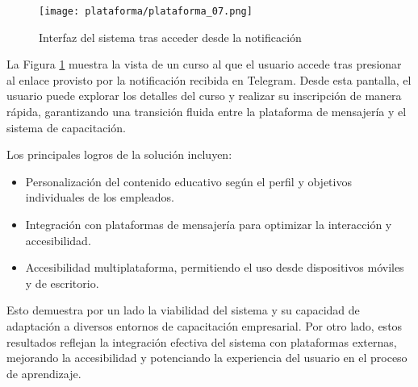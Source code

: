 \begin{figure}[H]
    \centering
    \texttt{[image: plataforma/plataforma\_07.png]}
    \caption{Interfaz del sistema tras acceder desde la notificación}
    \label{fig:interfaz_curso_ejemplo}
\end{figure}

La Figura \ref{fig:interfaz_curso_ejemplo} muestra la vista de un curso al que
el usuario accede tras presionar al enlace provisto por la notificación
recibida en Telegram. Desde esta pantalla, el usuario puede explorar los
detalles del curso y realizar su inscripción de manera rápida, garantizando una
transición fluida entre la plataforma de mensajería y el sistema de
capacitación.

Los principales logros de la solución incluyen:
\begin{itemize}
    \item Personalización del contenido educativo según el perfil y objetivos
    individuales de los empleados.
    \item Integración con plataformas de mensajería para optimizar la
    interacción y accesibilidad.
    \item Accesibilidad multiplataforma, permitiendo el uso desde dispositivos
    móviles y de escritorio.
\end{itemize}

Esto demuestra por un lado la viabilidad del sistema y su capacidad de
adaptación a diversos entornos de capacitación empresarial. Por otro lado, estos
resultados reflejan la integración efectiva del sistema con plataformas
externas, mejorando la accesibilidad y potenciando la experiencia del usuario en
el proceso de aprendizaje.
